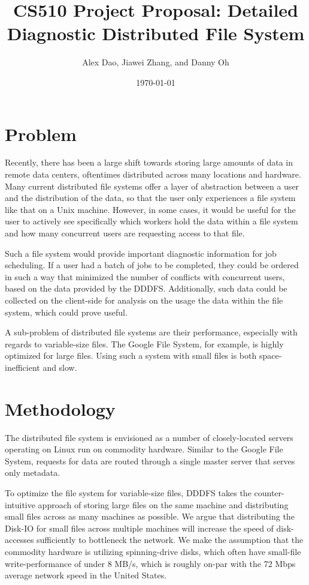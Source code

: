 \documentclass{article}
\title{CS510 Project Proposal: Detailed Diagnostic Distributed File System}
\date{\today}
\author{Alex Dao, Jiawei Zhang, and Danny Oh}
\begin{document}
\maketitle

\section{Problem}
Recently, there has been a large shift towards storing large amounts of data in remote data centers, oftentimes distributed across many locations and hardware. Many current distributed file systems offer a layer of abstraction between a user and the distribution of the data, so that the user only experiences a file system like that on a Unix machine. However, in some cases, it would be useful for the user to actively see specifically which workers hold the data within a file system and how many concurrent users are requesting access to that file. 

Such a file system would provide important diagnostic information for job scheduling. If a user had a batch of jobs to be completed, they could be ordered in such a way that minimized the number of conflicts with concurrent users, based on the data provided by the DDDFS. Additionally, such data could be collected on the client-side for analysis on the usage the data within the file system, which could prove useful.

A sub-problem of distributed file systems are their performance, especially with regards to variable-size files. The Google File System, for example, is highly optimized for large files. Using such a system with small files is both space-inefficient and slow. 

\section{Methodology} 

The distributed file system is envisioned as a number of closely-located servers operating on Linux run on commodity hardware. Similar to the Google File System, requests for data are routed through a single master server that serves only metadata. 

To optimize the file system for variable-size files, DDDFS takes the counter-intuitive approach of storing large files on the same machine and distributing small files across as many machines as possible. We argue that distributing the Disk-IO for small files across multiple machines will increase the speed of disk-accesses sufficiently to bottleneck the network. We make the assumption that the commodity hardware is utilizing spinning-drive disks, which often have small-file write-performance of under 8 MB/s, which is roughly on-par with the 72 Mbps average network speed in the United States. 
\end{document}
